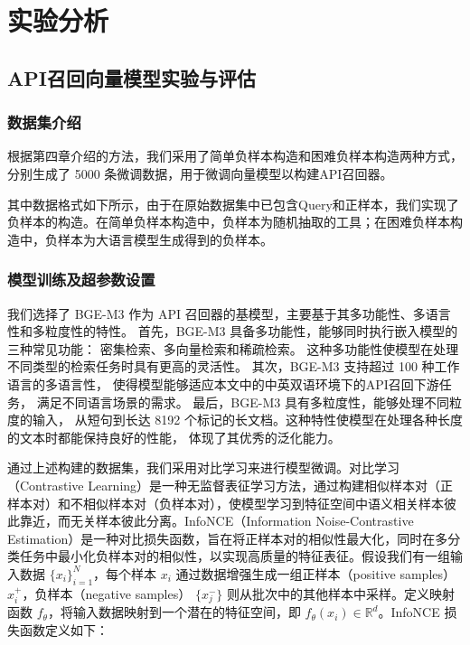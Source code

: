 \chapter{实验分析}

\section{API召回向量模型实验与评估}

\subsection{数据集介绍}

根据第四章介绍的方法，我们采用了简单负样本构造和困难负样本构造两种方式，分别生成了 5000 条微调数据，用于微调向量模型以构建API召回器。

其中数据格式如下所示，由于在原始数据集中已包含Query和正样本，我们实现了负样本的构造。在简单负样本构造中，负样本为随机抽取的工具；在困难负样本构造中，负样本为大语言模型生成得到的负样本。

\subsection{模型训练及超参数设置}

我们选择了 BGE-M3\cite{chen2024bge} 作为 API 召回器的基模型，主要基于其多功能性、多语言性和多粒度性的特性。
首先，BGE-M3 具备多功能性，能够同时执行嵌入模型的三种常见功能：
密集检索、多向量检索和稀疏检索。
这种多功能性使模型在处理不同类型的检索任务时具有更高的灵活性。
其次，BGE-M3 支持超过 100 种工作语言的多语言性，
使得模型能够适应本文中的中英双语环境下的API召回下游任务，
满足不同语言场景的需求。
最后，BGE-M3 具有多粒度性，能够处理不同粒度的输入，
从短句到长达 8192 个标记的长文档。这种特性使模型在处理各种长度的文本时都能保持良好的性能，
体现了其优秀的泛化能力。

通过上述构建的数据集，我们采用对比学习来进行模型微调。对比学习（Contrastive Learning）是一种无监督表征学习方法，通过构建相似样本对（正样本对）和不相似样本对（负样本对），使模型学习到特征空间中语义相关样本彼此靠近，而无关样本彼此分离。InfoNCE（Information Noise-Contrastive Estimation）是一种对比损失函数，旨在将正样本对的相似性最大化，同时在多分类任务中最小化负样本对的相似性，以实现高质量的特征表征。假设我们有一组输入数据 $\{x_i\}_{i=1}^N$，每个样本 $x_i$ 通过数据增强生成一组正样本（positive samples）$x_i^+$，负样本（negative samples） $\{x_j^-\}$ 则从批次中的其他样本中采样。定义映射函数 $f_{\theta}$，将输入数据映射到一个潜在的特征空间，即 $f_{\theta}(x_i) \in \mathbb{R}^d$。InfoNCE 损失函数定义如下：

